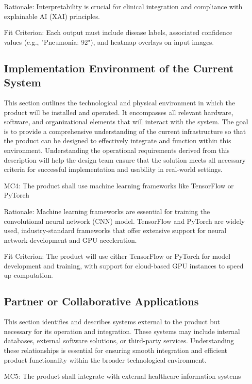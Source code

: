 \documentclass[12pt]{article}
\begin{document}
Rationale: Interpretability is crucial for clinical integration and compliance with explainable AI (XAI) principles.

Fit Criterion: Each output must include disease labels, associated confidence values (e.g., "Pneumonia: 92"), and heatmap overlays on input images.

\subsection{Implementation Environment of the Current System}
This section outlines the technological and physical environment in which the product will be installed and operated. It encompasses all relevant hardware, software, and organizational elements that will interact with the system. The goal is to provide a comprehensive understanding of the current infrastructure so that the product can be designed to effectively integrate and function within this environment. Understanding the operational requirements derived from this description will help the design team ensure that the solution meets all necessary criteria for successful implementation and usability in real-world settings.

\indent
MC4: The product shall use machine learning frameworks like TensorFlow or PyTorch

Rationale: Machine learning frameworks are essential for training the convolutional neural network (CNN) model. TensorFlow and PyTorch are widely used, industry-standard frameworks that offer extensive support for neural network development and GPU acceleration.

Fit Criterion: The product will use either TensorFlow or PyTorch for model development and training, with support for cloud-based GPU instances to speed up computation.

\subsection{Partner or Collaborative Applications}
This section identifies and describes systems external to the product but necessary for its operation and integration. These systems may include internal databases, external software solutions, or third-party services. Understanding these relationships is essential for ensuring smooth integration and efficient product functionality within the broader technological environment.

\indent
MC5: The product shall integrate with external healthcare information systems
\end{document}
